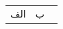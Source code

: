 \documentclass{article}
\begin{document}
\begin{tabular}{rl}
الف & ب \
\end{tabular}
\end{document}
